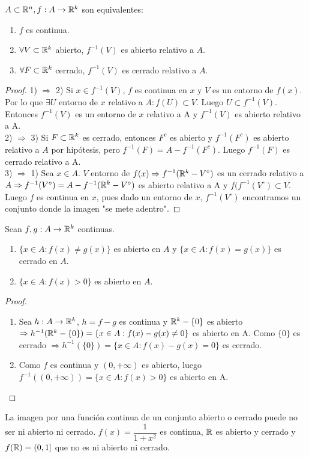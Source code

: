 \begin{prop}
  $A \subset \mathbb{R}^n, f: A \to \mathbb{R}^k$ son equivalentes:
  \begin{enumerate}
    \item $f$ es continua.
    \item $\forall V \subset \mathbb{R}^k$ abierto, $f^{-1}(V)$ es abierto relativo a $A$.
    \item $\forall F \subset \mathbb{R}^k$ cerrado, $f^{-1}(V)$ es cerrado relativo a $A$.
  \end{enumerate}
  \begin{proof}
    1) $\Rightarrow$ 2)  Si $x \in f^{-1}(V)$, $f$ es continua en $x$ y $V$ es un entorno de $f(x)$. Por lo que $\exists U$ entorno de $x$ relativo a $A : f(U) \subset V$. Luego $U \subset f^{-1}(V)$. Entonces $f^{-1}(V)$ es un entorno de $x$ relativo a A y $f^{-1}(V)$ es abierto relativo a A. \\
    2) $\Rightarrow$ 3) Si $F \subset \mathbb{R}^k$ es cerrado, entonces $F^c$ es abierto y $f^{-1}(F^c)$ es abierto relativo a $A$ por hipótesis, pero $f^{-1}(F) = A - f^{-1}(F^c)$. Luego $f^{-1}(F)$ es cerrado relativo a A. \\
    3) $\Rightarrow$ 1) Sea $x \in A$. $V$ entorno de $f(x) \Rightarrow f^{-1}(\mathbb{R}^k - V^{\circ})$ es un cerrado relativo a $A \Rightarrow f^{-1}(V^{\circ}) = A - f^{-1}(\mathbb{R}^k - V^{\circ})$ es abierto relativo a A y $f(f^{-1}(V^{\circ}) \subset V$. Luego $f$ es continua en $x$, pues dado un entorno de $x$, $f^{-1}(V^{\circ})$ encontramos un conjunto donde la imagen "se mete adentro".
  \end{proof}
\end{prop}

\begin{corollary}
  Sean $f, g: A \to \mathbb{R}^k$ continuas.
  \begin{enumerate}
    \item $\{ x \in A : f(x) \neq g(x) \}$ es abierto en $A$ y $\{x \in A: f(x) = g(x)\}$ es cerrado en $A$.
    \item $\{x \in A : f(x) > 0\}$ es abierto en $A$.
  \end{enumerate}
  \begin{proof}
    \begin{enumerate}
      \item Sea $h: A \to \mathbb{R}^k$, $h = f - g$ es continua y $\mathbb{R}^k - \{0\}$ es abierto $\Rightarrow h^{-1}(\mathbb{R}^k - \{0\}) = \{ x \in A : f(x) - g(x) \neq 0 \}$ es abierto en A. Como $\{0\}$ es cerrado $\Rightarrow h^{-1}(\{0\}) = \{ x \in A : f(x) - g(x) = 0\}$ es cerrado.
      \item Como $f$ es continua y $(0, +\infty)$ es abierto, luego $f^{-1}((0, +\infty)) = \{x \in A : f(x) > 0\}$ es abierto en A.
    \end{enumerate}
  \end{proof}
\end{corollary}

\begin{note}
  La imagen por una función continua de un conjunto abierto o cerrado puede no ser ni abierto ni cerrado. $f(x) = \dfrac{1}{1+x^2}$ es continua, $\mathbb{R}$ es abierto y cerrado y $f(\mathbb{R}) = (0, 1]$ que no es ni abierto ni cerrado.
\end{note}
